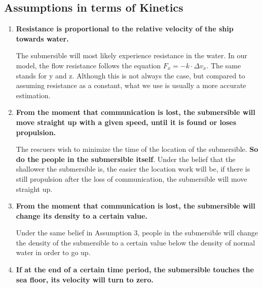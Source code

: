 \documentclass[12pt]{article}
\begin{document}
\subsection{Assumptions in terms of Kinetics}
\begin{enumerate}
    \item \textbf{Resistance is proportional to the relative velocity of the ship towards water.}
    
    The submersible will most likely experience resistance in the water. In our model, the flow resistance follows the equation $ F_x=-k\cdot\Delta v_x$. The same stands for y and z. Although this is not always the case, but compared to assuming resistance as a constant, what we use is usually a more accurate estimation.
 
	\item \textbf{From the moment that communication is lost, the submersible will move straight up with a given speed, until it is found or loses propulsion.}
 
	The rescuers wish to minimize the time of the location of the submersible. \textbf{So do the people in the submersible itself}. Under the belief that the shallower the submersible is, the easier the location work will be, if there is still propulsion after the loss of communication, the submersible will move straight up.
    \item \textbf{From the moment that communication is lost, the submersible will change its density to a certain value.}
    
    Under the same belief in Assumption 3, people in the submersible will change the density of the submersible to a certain value below the density of normal water in order to go up.
	\item \textbf{If at the end of a certain time period, the submersible touches the sea floor, its velocity will turn to zero.}
 

\end{enumerate}
\end{document}
